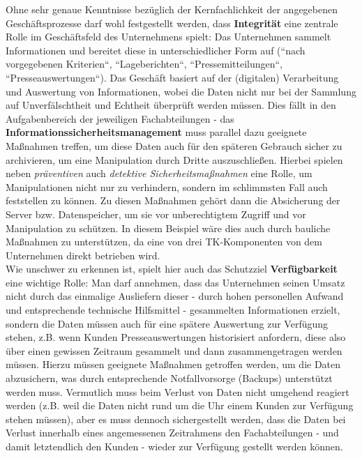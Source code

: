 Ohne sehr genaue Kenntnisse bezüglich der Kernfachlichkeit der angegebenen Geschäftsprozesse darf wohl festgestellt werden, dass \textbf{Integrität} eine zentrale Rolle im Geschäftsfeld des Unternehmens spielt: Das Unternehmen sammelt Informationen und bereitet diese in unterschiedlicher Form auf (``nach vorgegebenen Kriterien``, ``Lageberichten``, ``Pressemitteilungen``, ``Presseauswertungen``).
Das Geschäft basiert auf der (digitalen) Verarbeitung und Auswertung von Informationen, wobei die Daten nicht nur bei der Sammlung auf Unverfälschtheit und Echtheit überprüft werden müssen.
Dies fällt in den Aufgabenbereich der jeweiligen Fachabteilungen - das \textbf{Informationssicherheitsmanagement} muss parallel dazu geeignete Maßnahmen treffen, um diese Daten auch für den späteren Gebrauch sicher zu archivieren, um eine Manipulation durch Dritte auszuschließen.
Hierbei spielen neben \textit{präventiven} auch \textit{detektive Sicherheitsmaßnahmen} eine Rolle, um Manipulationen nicht nur zu verhindern, sondern im schlimmsten Fall auch feststellen zu können.
Zu diesen Maßnahmen gehört dann die Absicherung der Server bzw. Datenspeicher, um sie vor unberechtigtem Zugriff und vor Manipulation zu schützen.
In diesem Beispiel wäre dies auch durch bauliche Maßnahmen zu unterstützen, da eine von drei TK-Komponenten von dem Unternehmen direkt betrieben wird.\\

Wie unschwer zu erkennen ist, spielt hier auch das Schutzziel \textbf{Verfügbarkeit} eine wichtige Rolle: Man darf annehmen, dass das Unternehmen seinen Umsatz nicht durch das einmalige Ausliefern dieser - durch hohen personellen Aufwand und entsprechende technische Hilfsmittel - gesammelten Informationen erzielt, sondern die Daten müssen auch für eine spätere Auswertung zur Verfügung stehen, z.B. wenn Kunden Presseauswertungen historisiert anfordern, diese also über einen gewissen Zeitraum gesammelt und dann zusammengetragen werden müssen.
Hierzu müssen geeignete Maßnahmen getroffen werden, um die Daten abzusichern, was durch entsprechende Notfallvorsorge (Backups) unterstützt werden muss.
Vermutlich muss beim Verlust von Daten nicht umgehend reagiert werden (z.B. weil die Daten nicht rund um die Uhr einem Kunden zur Verfügung stehen müssen), aber es muss dennoch sichergestellt werden, dass die Daten bei Verlust innerhalb eines angemessenen Zeitrahmens den Fachabteilungen - und damit letztendlich den Kunden - wieder zur Verfügung gestellt werden können.\\

